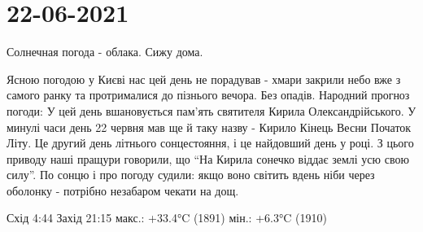  
 
 
 
 
\section{22-06-2021}
\label{sec:kiev.pogoda.22_06_2021}

Солнечная погода - облака. Сижу дома.

Ясною погодою у Києві нас цей день не порадував - хмари закрили небо вже з
самого ранку та протрималися до пізнього вечора. Без опадів.  Народний прогноз
погоди: У цей день вшановується пам'ять святителя Кирила Олександрійського. У
минулі часи день 22 червня мав ще й таку назву - Кирило Кінець Весни Початок
Літу. Це другий день літнього сонцестояння, і це найдовший день у році. З цього
приводу наші пращури говорили, що \enquote{На Кирила сонечко віддає землі усю свою
силу}. По сонцю і про погоду судили: якщо воно світить вдень ніби через
оболонку - потрібно незабаром чекати на дощ.

Схід 4:44 Захід 21:15
макс.: +33.4°C (1891) мін.: +6.3°C (1910)

